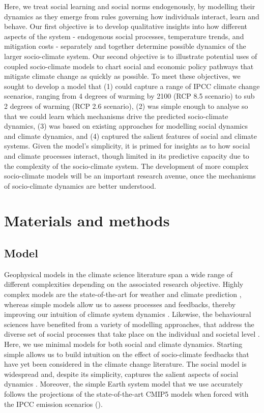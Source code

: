 \documentclass[10pt,letterpaper]{article}
\begin{document}
Here, we treat social learning and social norms endogenously, by modelling their dynamics as they emerge from rules governing how individuals interact, learn and behave. Our first objective is to develop qualitative insights into how different aspects of the system - endogenous social processes, temperature trends, and mitigation costs - separately and together determine possible dynamics of the larger socio-climate system. Our second objective is to illustrate potential uses of coupled socio-climate models to chart social and economic policy pathways that mitigate climate change as quickly as possible. To meet these objectives, we sought to develop a model that (1) could capture a range of IPCC climate change scenarios, ranging from 4 degrees of warming by 2100 (RCP 8.5 scenario) to sub 2 degrees of warming (RCP 2.6 scenario), (2) was simple enough to analyse so that we could learn which mechanisms drive the predicted socio-climate dynamics, (3) was based on existing approaches for modelling social dynamics and climate dynamics, and (4) captured the salient features of social and climate systems.
Given the model's simplicity, it is primed for insights as to how social and climate processes interact, though limited in its predictive capacity due to the complexity of the socio-climate system. The development of more complex socio-climate models will be an important research avenue, once the mechanisms of socio-climate dynamics are better understood.



\section*{Materials and methods}

\subsection*{Model}
Geophysical models in the climate science literature span a wide range of different complexities depending on the associated research objective. Highly complex models are the state-of-the-art for weather and climate prediction \cite{sterman12,knutti13,kusunoki16}, whereas simple models allow us to assess processes and feedbacks, thereby improving our intuition  of climate system dynamics \cite{lenton00,cox00,cox06,nakajima92,may04}. Likewise, the behavioural sciences have benefited from a variety of modelling approaches, that address the diverse set of social processes that take place on the individual and societal level \cite{helbing10}. Here, we use minimal models for both social and climate dynamics. Starting simple allows us to build intuition on the effect of socio-climate feedbacks that have yet been considered in the climate change literature. The social model is widespread and, despite its simplicity, captures the salient aspects of social dynamics \cite{helbing10,innes13,henderson16}. Moreover, the simple Earth system model that we use\cite{lenton00} accurately follows the projections of the state-of-the-art CMIP5 models when forced with the IPCC emission scenarios ().
\end{document}
